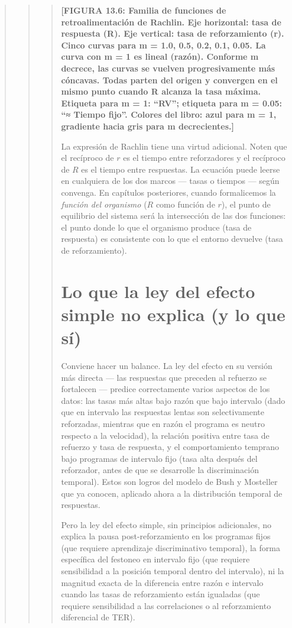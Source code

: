 \documentclass[
  letterpaper,
  DIV=11,
  numbers=noendperiod]{scrreprt}
\begin{document}
\begin{tcolorbox}[enhanced jigsaw, arc=.35mm, bottomrule=.15mm, breakable, colback=white, colframe=quarto-callout-note-color-frame, left=2mm, leftrule=.75mm, opacityback=0, rightrule=.15mm, toprule=.15mm]
\begin{quote}
\begin{quote}
\begin{quote}
\textbf{{[}FIGURA 13.6: Familia de funciones de retroalimentación de
Rachlin. Eje horizontal: tasa de respuesta (R). Eje vertical: tasa de
reforzamiento (r). Cinco curvas para m = 1.0, 0.5, 0.2, 0.1, 0.05. La
curva con m = 1 es lineal (razón). Conforme m decrece, las curvas se
vuelven progresivamente más cóncavas. Todas parten del origen y
convergen en el mismo punto cuando R alcanza la tasa máxima. Etiqueta
para m = 1: ``RV''; etiqueta para m = 0.05: ``≈ Tiempo fijo''. Colores
del libro: azul para m = 1, gradiente hacia gris para m
decrecientes.{]}}

La expresión de Rachlin tiene una virtud adicional. Noten que el
recíproco de \(r\) es el tiempo entre reforzadores y el recíproco de
\(R\) es el tiempo entre respuestas. La ecuación puede leerse en
cualquiera de los dos marcos --- tasas o tiempos --- según convenga. En
capítulos posteriores, cuando formalicemos la \emph{función del
organismo} (\(R\) como función de \(r\)), el punto de equilibrio del
sistema será la intersección de las dos funciones: el punto donde lo que
el organismo produce (tasa de respuesta) es consistente con lo que el
entorno devuelve (tasa de reforzamiento).

\mbox{}%
\section{Lo que la ley del efecto simple no explica (y lo que
sí)}\label{lo-que-la-ley-del-efecto-simple-no-explica-y-lo-que-suxed}

Conviene hacer un balance. La ley del efecto en su versión más directa
--- las respuestas que preceden al refuerzo se fortalecen --- predice
correctamente varios aspectos de los datos: las tasas más altas bajo
razón que bajo intervalo (dado que en intervalo las respuestas lentas
son selectivamente reforzadas, mientras que en razón el programa es
neutro respecto a la velocidad), la relación positiva entre tasa de
refuerzo y tasa de respuesta, y el comportamiento temprano bajo
programas de intervalo fijo (tasa alta después del reforzador, antes de
que se desarrolle la discriminación temporal). Estos son logros del
modelo de Bush y Mosteller que ya conocen, aplicado ahora a la
distribución temporal de respuestas.

Pero la ley del efecto simple, sin principios adicionales, no explica la
pausa post-reforzamiento en los programas fijos (que requiere
aprendizaje discriminativo temporal), la forma específica del festoneo
en intervalo fijo (que requiere sensibilidad a la posición temporal
dentro del intervalo), ni la magnitud exacta de la diferencia entre
razón e intervalo cuando las tasas de reforzamiento están igualadas (que
requiere sensibilidad a las correlaciones o al reforzamiento diferencial
de TER).


\end{quote}
\end{quote}
\end{quote}
\end{tcolorbox}
\end{document}
